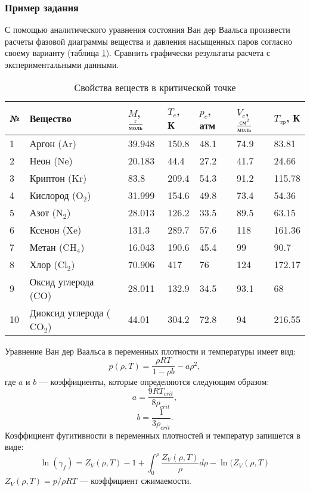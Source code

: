 \subsubsection*{Пример задания}
С помощью аналитического уравнения состояния Ван дер Ваальса произвести расчеты фазовой диаграммы вещества и давления насыщенных паров согласно своему варианту (таблица \ref{tab:eos.task}). Сравнить графически результаты расчета с экспериментальными данными.
\begin{table}[ht]
	\caption{Свойства веществ в критической точке}
	\label{tab:eos.task}
	\begin{tabularx}{\textwidth}%
		{|p{}
			|p{}
			|X
			|X
			|X
			|X
			|X|
		}
		\hline
		№  & Вещество  & $M$, $\frac{г}{моль}$  & $T_{c}$, К  & $p_{c}$, атм  & $V_{c}$, ${\frac{см^2}{моль}}$ & $T_{тр}$, К  \\ \hline \hline
		1 & Аргон (Ar)  & 39.948  & 150.8 & 48.1 & 74.9 & 83.81 \\ \hline
		2 & Неон (Ne) & 20.183 & 44.4 & 27.2 & 41.7 & 24.66 \\ \hline
		3 & Криптон (Kr) & 83.8 & 209.4 & 54.3 & 91.2 & 115.78 \\ \hline
		4 & Кислород ($\mathrm{O_2}$) & 31.999 & 154.6 & 49.8 & 73.4 & 54.36\\ \hline
		5 & Азот ($\mathrm{N_2}$) & 28.013 & 126.2 & 33.5 & 89.5 & 63.15 \\ \hline
		6 & Ксенон (Xe) & 131.3 & 289.7 & 57.6 & 118 & 161.36 \\ \hline
		7 & Метан ($\mathrm{CH_4}$) & 16.043 & 190.6 & 45.4 & 99 & 90.7 \\ \hline
		8 & Хлор ($\mathrm{Cl_2}$) & 70.906 & 417 & 76 & 124 & 172.17 \\ \hline
		9 & Оксид углерода (CO) & 28.011 & 132.9 & 34.5 & 93.1 & 68 \\ \hline
		10 & Диоксид углерода ($\mathrm{CO_2}$) &44.01 & 304.2 & 72.8 & 94 &	216.55 \\ \hline
	\end{tabularx}
\end{table}

Уравнение Ван дер Ваальса в переменных плотности и температуры имеет вид:
\begin{equation*}
p(\rho,T)=\dfrac{\rho R T}{1-\rho b} - a \rho^2,
\end{equation*}
где $a$ и $b$ --- коэффициенты, которые определяются следующим образом:
\begin{equation*}
a=\dfrac{9 R T_{crit}}{8 \rho_{crit}},
\end{equation*}
\begin{equation*}
b=\dfrac{1}{3 \rho_{crit}}.
\end{equation*}
Коэффициент фугитивности в переменных плотностей и температур запишется в виде:
\begin{equation*}
\ln(\gamma_f)=Z_V(\rho,T)-1+\int_{0}^{\rho} \dfrac{Z_V(\rho,T)}{\rho} d\rho -\ln(Z_V(\rho,T)
\end{equation*}
$Z_V(\rho,T)=p/{\rho R T}$ --- коэффициент сжимаемости.
